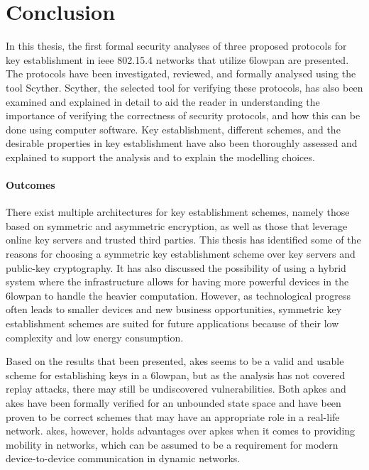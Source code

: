 \chapter{Conclusion}
\label{chp:conclusion}


In this thesis, the first formal security analyses of three proposed protocols for key establishment in \gls{ieee} 802.15.4 networks that utilize \gls{6lowpan} are presented. The protocols have been investigated, reviewed, and formally analysed using the tool Scyther. Scyther, the selected tool for verifying these protocols, has also been examined and explained in detail to aid the reader in understanding the importance of verifying the correctness of security protocols, and how this can be done using computer software. Key establishment, different schemes, and the desirable properties in key establishment have also been thoroughly assessed and explained to support the analysis and to explain the modelling choices.

\subsubsection{Outcomes}

There exist multiple architectures for key establishment schemes, namely those based on symmetric and asymmetric encryption, as well as those that leverage online key servers and trusted third parties. This thesis has identified some of the reasons for choosing a symmetric key establishment scheme over key servers and public-key cryptography. It has also discussed the possibility of using a hybrid system where the infrastructure allows for having more powerful devices in the \gls{6lowpan} to handle the heavier computation. However, as technological progress often leads to smaller devices and new business opportunities, symmetric key establishment schemes are suited for future applications because of their low complexity and low energy consumption.


Based on the results that been presented, \gls{akes} seems to be a valid and usable scheme for establishing keys in a \gls{6lowpan}, but as the analysis has not covered replay attacks, there may still be undiscovered vulnerabilities. Both \gls{apkes} and \gls{akes} have been formally verified for an unbounded state space and have been proven to be correct schemes that may have an appropriate role in a real-life network. \gls{akes}, however, holds advantages over \gls{apkes} when it comes to providing mobility in networks, which can be assumed to be a requirement for modern device-to-device communication in dynamic networks.

